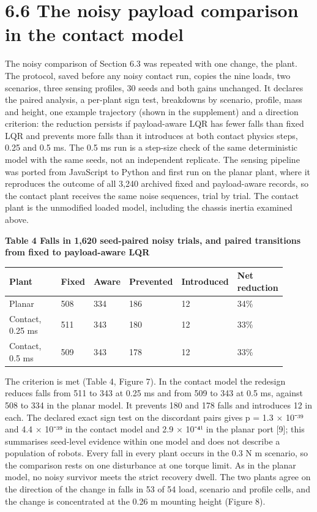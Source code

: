 \documentclass[11pt,a4paper]{article}
\begin{document}
\section*{6.6 The noisy payload comparison in the contact model}
The noisy comparison of Section 6.3 was repeated with one change, the plant. The protocol, saved before any noisy contact run, copies the nine loads, two scenarios, three sensing profiles, 30 seeds and both gains unchanged. It declares the paired analysis, a per-plant sign test, breakdowns by scenario, profile, mass and height, one example trajectory (shown in the supplement) and a direction criterion: the reduction persists if payload-aware LQR has fewer falls than fixed LQR and prevents more falls than it introduces at both contact physics steps, 0.25 and 0.5 ms. The 0.5 ms run is a step-size check of the same deterministic model with the same seeds, not an independent replicate. The sensing pipeline was ported from JavaScript to Python and first run on the planar plant, where it reproduces the outcome of all 3,240 archived fixed and payload-aware records, so the contact plant receives the same noise sequences, trial by trial. The contact plant is the unmodified loaded model, including the chassis inertia examined above.

\textbf{Table 4 Falls in 1,620 seed-paired noisy trials, and paired transitions from fixed to payload-aware LQR}
\begin{longtable}{p{0.252\linewidth}p{0.117\linewidth}p{0.117\linewidth}p{0.135\linewidth}p{0.135\linewidth}p{0.144\linewidth}}
\toprule
Plant & Fixed & Aware & Prevented & Introduced & Net reduction \\ \midrule \endhead
Planar & 508 & 334 & 186 & 12 & 34\% \\
Contact, 0.25 ms & 511 & 343 & 180 & 12 & 33\% \\
Contact, 0.5 ms & 509 & 343 & 178 & 12 & 33\% \\
\bottomrule
\end{longtable}
The criterion is met (Table 4, Figure 7). In the contact model the redesign reduces falls from 511 to 343 at 0.25 ms and from 509 to 343 at 0.5 ms, against 508 to 334 in the planar model. It prevents 180 and 178 falls and introduces 12 in each. The declared exact sign test on the discordant pairs gives p = 1.3 \ensuremath{\times} 10⁻³⁹ and 4.4 \ensuremath{\times} 10⁻³⁹ in the contact model and 2.9 \ensuremath{\times} 10⁻⁴¹ in the planar port [9]; this summarises seed-level evidence within one model and does not describe a population of robots. Every fall in every plant occurs in the 0.3 N m scenario, so the comparison rests on one disturbance at one torque limit. As in the planar model, no noisy survivor meets the strict recovery dwell. The two plants agree on the direction of the change in falls in 53 of 54 load, scenario and profile cells, and the change is concentrated at the 0.26 m mounting height (Figure 8).
\end{document}
